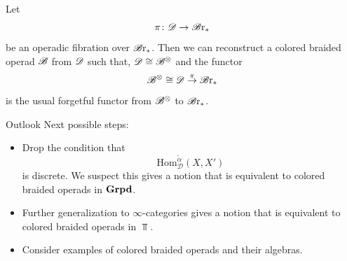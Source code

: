 \begin{frame}
    \begin{prop}
    Let
    \[
        \pi \colon \mathscr{D} \to \mathscr{B} \text{r}_{\ast}
    \]
    be an operadic fibration over $\mathscr{B} \text{r}_{\ast}$. Then we can reconstruct a colored
    braided operad $\mathscr{B}$ from $\mathscr{D}$ such that, $\mathscr{D} \cong \mathscr{B}^{\otimes}$ and the functor
    \[
        \mathscr{B}^{\otimes} \cong \mathscr{D} \overset{\pi}{\to} \mathscr{B} \text{r}_{\ast}
    \]
    is the usual forgetful functor from $\mathscr{B}^{\otimes}$ to $\mathscr{B} \text{r}_{\ast}$.
\end{prop}
\end{frame}

\begin{frame}{Outlook}
    Next possible steps:
    \begin{itemize}
        \item Drop the condition that $$\mathrm{Hom}_{\mathcal{D}}^{\widetilde{\alpha}}(X, X')$$ is
            discrete. We suspect this gives a notion that is equivalent to colored braided operads in $\operatorname{\textbf{Grpd}}$.
        \item Further generalization to $\infty$-categories gives a notion that is equivalent to colored braided operads in $\Top$.
        \item Consider examples of colored braided operads and their algebras.
    \end{itemize}
\end{frame}